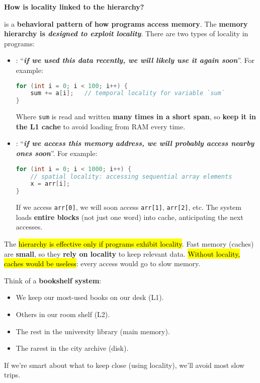 \highspace
\begin{flushleft}
    \textcolor{Green3}{ \textbf{How is locality linked to the hierarchy?}}
\end{flushleft}
 is a \textbf{behavioral pattern of how programs access memory}. The \textbf{memory hierarchy is \emph{designed to exploit locality}}. There are two types of locality in programs:
\begin{itemize}
    \item {}: ``\emph{\textbf{if we used this data recently, we will likely use it again soon}}''. For example:
    \begin{lstlisting}[language=c]
for (int i = 0; i < 100; i++) {
    sum += a[i];   // temporal locality for variable `sum`
}\end{lstlisting}
    Where \texttt{sum} is read and written \textbf{many times in a short span}, so \textbf{keep it in the L1 cache} to avoid loading from RAM every time.

    \item {}: ``\emph{\textbf{if we access this memory address, we will probably access nearby ones soon}}''. For example:
    \begin{lstlisting}[language=c]
for (int i = 0; i < 1000; i++) {
    // spatial locality: accessing sequential array elements
    x = arr[i];
}\end{lstlisting}
    If we access \texttt{arr[0]}, we will soon access \texttt{arr[1]}, \texttt{arr[2]}, etc. The system loads \textbf{entire blocks} (not just one word) into cache, anticipating the next accesses.
\end{itemize}
The \hl{hierarchy is effective only if programs exhibit locality}. Fast memory (caches) are \textbf{small}, so they \textbf{rely on locality} to keep relevant data. \hl{Without locality, caches would be useless}: every access would go to slow memory.

\begin{examplebox}
    Think of a \textbf{bookshelf system}:
    \begin{itemize}
        \item We keep our most-used books on our desk (L1).
        \item Others in our room shelf (L2).
        \item The rest in the university library (main memory).
        \item The rarest in the city archive (disk).
    \end{itemize}
    If we're smart about what to keep close (using locality), we'll avoid most slow trips.
\end{examplebox}